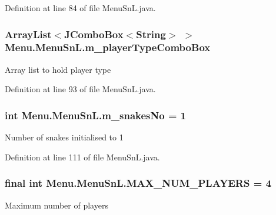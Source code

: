Definition at line 84 of file Menu\+Sn\+L.\+java.

\hypertarget{class_menu_1_1_menu_sn_l_a70c6fa4562124ab11bab5d572daf82b3}{}
\subsubsection[{m\+\_\+player\+Type\+Combo\+Box}]{\setlength{\rightskip}{0pt plus 5cm}Array\+List$<$J\+Combo\+Box$<$String$>$ $>$ Menu.\+Menu\+Sn\+L.\+m\+\_\+player\+Type\+Combo\+Box\hspace{0.3cm}{\ttfamily [private]}}\label{class_menu_1_1_menu_sn_l_a70c6fa4562124ab11bab5d572daf82b3}
Array list to hold player type 

Definition at line 93 of file Menu\+Sn\+L.\+java.

\hypertarget{class_menu_1_1_menu_sn_l_a5787c03e612eb9adb0f0ee976810be88}{}
\subsubsection[{m\+\_\+snakes\+No}]{\setlength{\rightskip}{0pt plus 5cm}int Menu.\+Menu\+Sn\+L.\+m\+\_\+snakes\+No = 1\hspace{0.3cm}{\ttfamily [private]}}\label{class_menu_1_1_menu_sn_l_a5787c03e612eb9adb0f0ee976810be88}
Number of snakes initialised to 1 

Definition at line 111 of file Menu\+Sn\+L.\+java.

\hypertarget{class_menu_1_1_menu_sn_l_afc7fd19db34602b6b5a85df60c736103}{}
\subsubsection[{M\+A\+X\+\_\+\+N\+U\+M\+\_\+\+P\+L\+A\+Y\+E\+R\+S}]{\setlength{\rightskip}{0pt plus 5cm}final int Menu.\+Menu\+Sn\+L.\+M\+A\+X\+\_\+\+N\+U\+M\+\_\+\+P\+L\+A\+Y\+E\+R\+S = 4\hspace{0.3cm}{\ttfamily [private]}}\label{class_menu_1_1_menu_sn_l_afc7fd19db34602b6b5a85df60c736103}
Maximum number of players 

